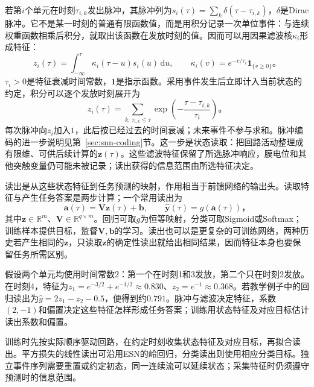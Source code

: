 若第$i$个单元在时刻$\tau_{i,k}$发出脉冲，其脉冲列为$s_i(\tau)=\sum_k\delta(\tau-\tau_{i,k})$，$\delta$是Dirac脉冲。它不是某一时刻的普通有限函数值，而是用积分记录一次单位事件：与连续权重函数相乘后积分，就取出该函数在发放时刻的值。因而可以用因果滤波核$\kappa_i$形成特征：
\begin{equation}
  z_i(\tau)=\int_{-\infty}^{\tau}\kappa_i(\tau-u)s_i(u)\,\mathrm du,
  \qquad \kappa_i(v)=e^{-v/\tau_i}\mathbf 1_{\{v\geq0\}}\text{。}
  \label{eq:rnn-lsm-filter}
\end{equation}
$\tau_i>0$是特征衰减时间常数，$\mathbf 1$是指示函数。采用事件发生后立即计入当前状态的约定，积分可以逐个发放时刻展开为
\begin{equation}
  z_i(\tau)=\sum_{k:\,\tau_{i,k}\leq\tau}
    \exp\!\left(-\frac{\tau-\tau_{i,k}}{\tau_i}\right)\text{。}
  \label{eq:rnn-lsm-event-sum}
\end{equation}
每次脉冲向$z_i$加入$1$，此后按已经过去的时间衰减；未来事件不参与求和。脉冲编码的进一步说明见第~\ref{sec:snn-coding}节。这一步是状态读取：把回路活动整理成有限维、可供后续计算的$\bm z(\tau)$。这些滤波特征保留了所选脉冲响应，膜电位和其他突触变量仍可能未被记录；读出获得的信息范围由所选特征决定。

读出是从这些状态特征到任务预测的映射，作用相当于前馈网络的输出头。读取特征与产生任务答案是两步计算；一个常用读出为
\begin{equation}
  \bm a(\tau)=\bm V\bm z(\tau)+\bm b,
  \qquad\widehat{\bm y}(\tau)=g(\bm a(\tau))\text{，}
  \label{eq:rnn-lsm-readout}
\end{equation}
其中$\bm z\in\mathbb R^m$、$\bm V\in\mathbb R^{q\times m}$。回归可取$g$为恒等映射，分类可取Sigmoid或Softmax；训练样本提供目标，监督$\bm V,\bm b$的学习。读出也可以是更复杂的可训练网络，两种历史若产生相同的$\bm z$，只读取$\bm z$的确定性读出就给出相同结果，因而特征本身也要保留任务所需区别。

\begin{example}[从脉冲活动到预测]
  \label{ex:rnn-lsm-readout}
  假设两个单元均使用时间常数2：第一个在时刻1和3发放，第二个只在时刻2发放。在时刻4，特征为$z_1=e^{-3/2}+e^{-1/2}\approx0.830$、$z_2=e^{-1}\approx0.368$。若教学例子中的回归读出为$\widehat y=2z_1-z_2-0.5$，便得到约$0.791$。脉冲与滤波决定特征，系数$(2,-1)$和偏置决定这些特征怎样形成任务答案；训练用状态特征及对应目标估计读出系数和偏置。
\end{example}

训练时先按实际顺序驱动回路，在约定时刻收集状态特征及对应目标，再拟合读出。平方损失的线性读出可沿用ESN的岭回归，分类读出则使用相应分类目标。独立事件序列需要重置或约定初态，同一连续流可以延续状态；采集特征时仍须遵守预测时的信息范围。

